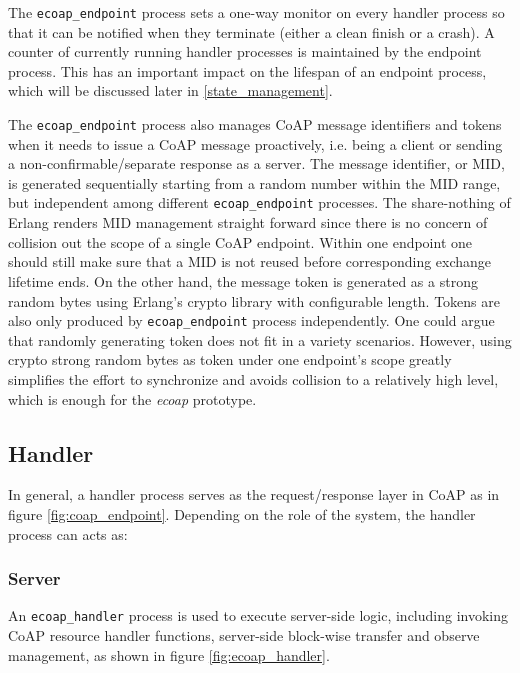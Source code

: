 The \verb|ecoap_endpoint| process sets a one-way monitor on every handler process so that it can be notified when they terminate (either a clean finish or a crash). A counter of currently running handler processes is maintained by the endpoint process. This has an important impact on the lifespan of an endpoint process, which will be discussed later in \ref{state_management}. 

The \verb|ecoap_endpoint| process also manages CoAP message identifiers and tokens when it needs to issue a CoAP message proactively, i.e. being a client or sending a non-confirmable/separate response as a server. The message identifier, or MID, is generated sequentially starting from a random number within the MID range, but independent among different \verb|ecoap_endpoint| processes. The share-nothing of Erlang renders MID management straight forward since there is no concern of collision out the scope of a single CoAP endpoint. Within one endpoint one should still make sure that a MID is not reused before corresponding exchange lifetime ends. On the other hand, the message token is generated as a strong random bytes using Erlang's crypto library with configurable length. Tokens are also only produced by  \verb|ecoap_endpoint| process independently. One could argue that randomly generating token does not fit in a variety scenarios. However, using crypto strong random bytes as token under one endpoint's scope greatly simplifies the effort to synchronize and avoids collision to a relatively high level, which is enough for the \textit{ecoap} prototype.

\subsection{Handler}\label{coap_handler}

In general, a handler process serves as the request/response layer in CoAP as in figure \ref{fig:coap_endpoint}. Depending on the role of the system, the handler process can acts as:

\subsubsection{Server}

An \verb|ecoap_handler| process is used to execute server-side logic, including invoking CoAP resource handler functions, server-side block-wise transfer and observe management, as shown in figure \ref{fig:ecoap_handler}. 


